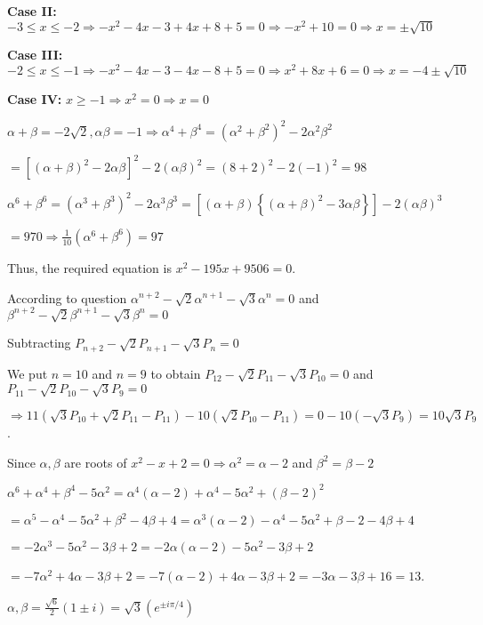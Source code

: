   {\bf Case II:} $-3\leq x\leq -2\Rightarrow -x^2 - 4x - 3 + 4x + 8 + 5 = 0 \Rightarrow -x^2 + 10 =
  0 \Rightarrow x = \pm\sqrt{10}$

  {\bf Case III:} $-2\leq x\leq -1\Rightarrow -x^2 - 4x - 3 - 4x - 8 + 5 = 0\Rightarrow x^2 + 8x + 6 =
  0\Rightarrow x = -4\pm\sqrt{10}$

  {\bf Case IV:} $x\geq -1\Rightarrow x^2 = 0 \Rightarrow x = 0$
\item $\alpha + \beta = -2\sqrt{2}, \alpha\beta = -1\Rightarrow \alpha^4 + \beta^4 = \left(\alpha^2
  + \beta^2\right)^2 - 2\alpha^2\beta^2$

  $= \left[\left(\alpha + \beta\right)^2 - 2\alpha\beta\right]^2 - 2\left(\alpha\beta\right)^2 = (8 + 2)^2 -
  2(-1)^2 = 98$

  $\alpha^6 + \beta^6 = \left(\alpha^3 + \beta^3\right)^2 - 2\alpha^3\beta^3 = [(\alpha
    + \beta)\left\{(\alpha + \beta)^2 - 3\alpha\beta\right\}] - 2(\alpha\beta)^3$

  $= 970 \Rightarrow \frac{1}{10}\left(\alpha^6 + \beta^6\right) = 97$

  Thus, the required equation is $x^2 - 195x + 9506 = 0$.
\item According to question $\alpha^{n + 2} - \sqrt{2}\alpha^{n + 1} - \sqrt{3}\alpha^n = 0$ and $\beta^{n +
  2} - \sqrt{2}\beta^{n + 1} - \sqrt{3}\beta^n = 0$

  Subtracting $P_{n + 2}- \sqrt{2}P_{n + 1} - \sqrt{3}P_n = 0$

  We put $n = 10$ and $n = 9$ to obtain $P_{12} - \sqrt{2}P_{11} - \sqrt{3}P_{10} = 0$ and $P_{11}
  - \sqrt{2}P_{10} - \sqrt{3}P_9 = 0$

  $\Rightarrow 11\left(\sqrt{3}P_{10} + \sqrt{2}P_{11} - P_{11}\right) - 10\left(\sqrt{2}P_{10} -
  P_{11}\right) = 0 - 10\left(-\sqrt{3}P_9\right) = 10\sqrt{3}P_9$.
\item Since $\alpha, \beta$ are roots of $x^2 - x + 2 = 0 \Rightarrow \alpha^2 = \alpha - 2$ and $\beta^2
  = \beta - 2$

  $\alpha^6 + \alpha^4 + \beta^4 - 5\alpha^2 = \alpha^4(\alpha - 2) + \alpha^4 - 5\alpha^2 + (\beta - 2)^2$

  $= \alpha^5 - \alpha^4 - 5\alpha^2 + \beta^2 - 4\beta + 4 = \alpha^3(\alpha - 2) - \alpha^4 - 5\alpha^2
  + \beta - 2 - 4\beta + 4$

  $= -2\alpha^3 - 5\alpha^2 - 3\beta + 2 = -2\alpha(\alpha - 2) - 5\alpha^2 - 3\beta + 2$

  $= -7\alpha^2 + 4\alpha - 3\beta + 2 = -7(\alpha - 2) + 4\alpha - 3\beta + 2 = -3\alpha - 3\beta + 16 =
  13$.
\item $\alpha, \beta = \frac{\sqrt{6}}{2}(1\pm i) = \sqrt{3}\left(e^{\pm i\pi/4}\right)$

